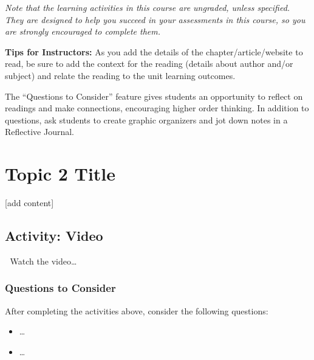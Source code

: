 \documentclass[
]{book}
\providecommand{\tightlist}{%
  \setlength{\itemsep}{0pt}\setlength{\parskip}{0pt}}
\begin{document}
\emph{Note that the learning activities in this course are ungraded, unless specified. They are designed to help you succeed in your assessments in this course, so you are strongly encouraged to complete them.}

\begin{feedback}
\textbf{Tips for Instructors:} As you add the details of the
chapter/article/website to read, be sure to add the context for the
reading (details about author and/or subject) and relate the reading to
the unit learning outcomes.

The ``Questions to Consider'' feature gives students an opportunity to
reflect on readings and make connections, encouraging higher order
thinking. In addition to questions, ask students to create graphic
organizers and jot down notes in a Reflective Journal.
\end{feedback}

\hypertarget{topic-2-title}{%
\section*{Topic 2 Title}\label{topic-2-title}}

{[}add content{]}

\hypertarget{activity-video}{%
\subsection*{Activity: Video}\label{activity-video}}

\begin{reflect}
🎦 Watch the video\ldots{}
\end{reflect}

\hypertarget{questions-to-consider}{%
\subsubsection*{Questions to Consider}\label{questions-to-consider}}

After completing the activities above, consider the following questions:

\begin{itemize}
\tightlist
\item
  \ldots{}\\
\item
  \ldots{}
\end{itemize}
\end{document}
